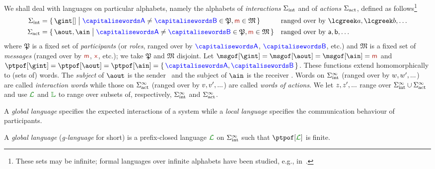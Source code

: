 We shall deal with languages on particular alphabets, namely the
alphabets of \emph{interactions} $\Sigma_{\text{int}}$ and of \emph{actions}
$\Sigma_{\text{act}}$, defined as follows\footnote{These sets may be infinite;
  formal languages over infinite alphabets have been studied, e.g.,
  in~\cite{ajb80}.}
%
\begin{align*}
  \alfint & = \Set{\gint[] \sst \p \neq \q \in \mathfrak{P}, \msg \in \mathfrak{M}}
  & & \text{ranged over by $\aint, \aint[b], \ldots$}
  \\
  \alfact & = \Set{\aout, \ain \sst \ptp[A] \neq \ptp[B] \in \mathfrak{P}, \msg \in \mathfrak{M}}
  & & \text{ranged over by $\aact, \aact[b], \ldots$}
\end{align*}
%
where $\mathfrak{P}$ is a fixed set of \emph{participants} (or
\emph{roles}, ranged over by $\p$, $\ptp[B]$, etc.) and $\mathfrak{M}$
is a fixed set of \emph{messages} (ranged over by $\msg$, $\msg[x]$,
etc.); we take $\mathfrak{P}$ and $\mathfrak{M}$ disjoint.
%
Let $\msgof[\gint] = \msgof[\aout] = \msgof[\ain] = \msg$ and
$\ptpof[\gint] = \ptpof[\aout] = \ptpof[\ain] = \Set{\p,\q}$.
%
These functions extend homomorphically to (sets of) words.
%
The \emph{subject} of $\aout$ is the sender \p\ and the subject of
$\ain$ is the receiver \q.
%
Words on $\Sigma_{\text{int}}^\infty$ (ranged over by $w,w',...$) are
called \emph{interaction words} while those on $\Sigma_{\text{act}}^\infty$
(ranged over by $v,v',...$) are called \emph{words of
  actions}.
%
We let $z,z',...$ range over
$\Sigma_{\text{int}}^\infty \cup \Sigma_{\text{act}}^\infty$ and use $\clang$ and $\alang$ to
range over subsets of, respectively, $\Sigma_{\text{int}}^\infty$ and
$\Sigma_{\text{act}}^\infty$.

A \emph{global language} specifies the expected interactions of a
system while a \emph{local language} specifies the communication
behaviour of participants.

\begin{definition}\label{def:chorlang}
  A \emph{global language} (\emph{g-language} for short) is a
  prefix-closed language $\clang$ on $\Sigma_{\text{int}}^\infty$ such that
  $\ptpof[\clang]$ is finite.
\end{definition}

